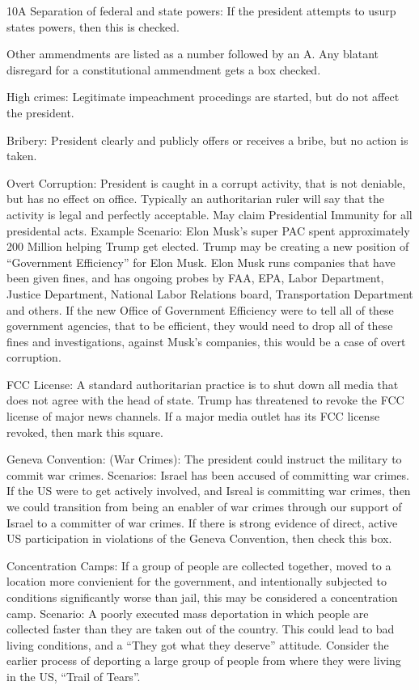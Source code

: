 \documentclass{article}
\begin{document}
10A Separation of federal and state powers:  If the president attempts to usurp states powers, then this is checked.

Other ammendments are listed as a number followed by an A.  Any blatant disregard for
a constitutional ammendment gets a box checked.

High crimes: Legitimate impeachment procedings are started, but do not affect the president.

Bribery:  President clearly and publicly offers or receives a bribe, but no action is
taken.

Overt Corruption: President is caught in a corrupt activity, that is not deniable, but
has no effect on office.  Typically an authoritarian ruler will say that the activity is
legal and perfectly acceptable.  May claim Presidential Immunity for all presidental
acts.
Example Scenario:  Elon Musk's super PAC spent approximately 200 Million helping Trump
get elected.
Trump may be creating a new position of ``Government Efficiency'' for Elon Musk.
Elon Musk runs companies that have been given fines, and has ongoing probes by FAA, EPA,
Labor Department, Justice Department, National Labor Relations board, Transportation Department
and others.  If the new Office of Government Efficiency were to tell all of these government
agencies, that to be efficient, they would need to drop all of these fines and investigations,
against Musk's companies, this would be a case of overt corruption.


FCC License: A standard authoritarian practice is to shut down all media that does not agree with the
head of state.  Trump has threatened to revoke the FCC license of major news channels.
If a major media outlet has its FCC license revoked, then mark this square.


Geneva Convention: (War Crimes): The president could instruct the military to commit war crimes.
Scenarios:  Israel has been accused of committing war crimes.  If the
US were to get actively involved, and Isreal is committing war crimes, then we could
transition from being an enabler of war crimes through our support of Israel to a
committer of war crimes.  If there is strong evidence of direct, active US participation
in violations of the Geneva Convention, then check this box.

Concentration Camps:  If a group of people are collected together, moved to a location
more convienient for the government, and intentionally subjected
to conditions significantly worse than jail, this may be considered
a concentration camp.
Scenario:  A poorly executed mass deportation in which people are collected
faster than they are taken out of the country.  This could lead to bad living conditions,
and a ``They got what they deserve'' attitude.  Consider the earlier process
of deporting a large group of people from where they were living in the US,
``Trail of Tears''.
\end{document}
